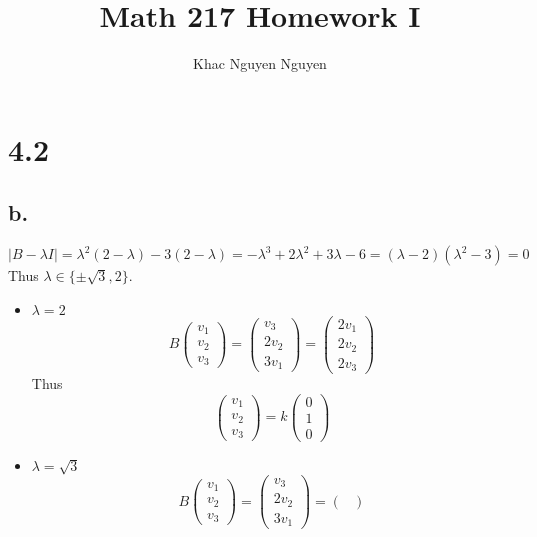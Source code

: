 \documentclass[11pt]{article}
\title{\textbf{Math 217 Homework I}}
\author{Khac Nguyen Nguyen}
\date{}
\theoremstyle{mystyle}
\theoremstyle{definition}
\begin{document}
\section*{4.2}
\subsection*{b.}
\[
  |B-\lambda I| = \lambda^2 (2-\lambda) - 3(2-\lambda) = -\lambda^3 + 2 \lambda^2 + 3\lambda - 6 = (\lambda-2)(\lambda^2 - 3) = 0 
\]
Thus $\lambda \in \{\pm \sqrt{3}, 2\}$. \\
\begin{itemize}
  \item $\lambda = 2$ \\
    \[
    B 
    \begin{pmatrix}
      v_1 \\
      v_2 \\
      v_3
    \end{pmatrix} = 
    \begin{pmatrix}
      v_3 \\
      2v_2 \\
      3v_1
    \end{pmatrix} 
    = 
    \begin{pmatrix}
      2v_1 \\ 
      2v_2 \\
      2v_3
    \end{pmatrix}
    \]
    Thus 
    \[
      \begin{pmatrix}
        v_1 \\
        v_2 \\
        v_3 
      \end{pmatrix}
      = k 
      \begin{pmatrix}
        0 \\
        1 \\
        0
      \end{pmatrix}
    \]
  \item $\lambda = \sqrt{3}$ \\
    \[
    B 
    \begin{pmatrix}
      v_1 \\
      v_2 \\
      v_3
    \end{pmatrix} = 
    \begin{pmatrix}
      v_3 \\
      2v_2 \\
      3v_1
    \end{pmatrix} 
    = 
    \begin{pmatrix}

\end{pmatrix}\]
\end{itemize}
\end{document}
